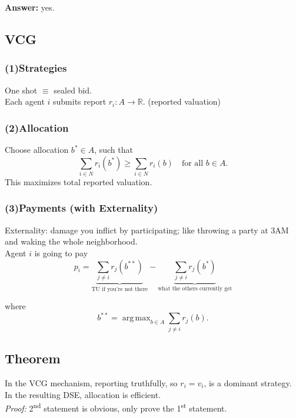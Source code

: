 \documentclass{article}
\DeclareMathOperator*{\argmax}{arg\,max}
\begin{document}
\noindent
\textbf{Answer:} yes.
\subsection*{VCG}
\subsubsection*{(1)\quad Strategies}
One shot $\equiv$ sealed bid.\\

\noindent
Each agent $i$ submits report $r_i:A\to\mathbb{R}$. (reported valuation)
\subsubsection*{(2)\quad Allocation}
Choose allocation $b^*\in A$, such that
\begin{equation*}
    \sum_{i\in N}r_i(b^*)\geq\sum_{i\in N}r_i(b)\quad\text{for all }b\in A.
\end{equation*}
This maximizes total reported valuation.
\subsubsection*{(3)\quad Payments (with Externality)}
Externality: damage you inflict by participating; like throwing a party at 3AM and waking the whole neighborhood.\\

\noindent
Agent $i$ is going to pay
\begin{equation*}
    p_i=\underbrace{\sum_{j\neq i}r_j(b^{**})}_{\text{TU if you're not there}}-\underbrace{\sum_{j\neq i}r_j(b^*)}_{\text{what the others currently get}}
\end{equation*}

where
\begin{equation*}
    b^{**}=\argmax_{b\in A}\sum_{j\neq i}r_j(b).
\end{equation*}

\subsection*{Theorem}
In the VCG mechanism, reporting truthfully, so $r_i=v_i$, is a dominant strategy. In the resulting DSE, allocation is efficient.\\

\noindent
\textit{Proof:} 2\textsuperscript{nd} statement is obvious, only prove the 1\textsuperscript{st} statement.\\
\end{document}
